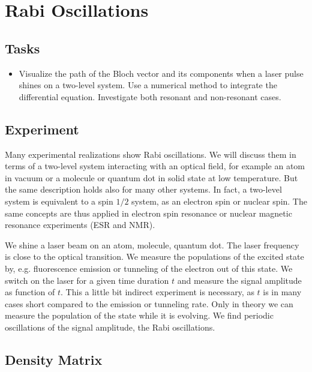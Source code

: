 

\chapter{Rabi Oscillations}



\section{Tasks}

\begin{itemize}
\item  Visualize the  path of the Bloch vector and its components when a laser pulse shines on a two-level system. Use a numerical method to integrate the differential equation. Investigate both resonant and non-resonant cases.
\end{itemize}



\section{Experiment}

Many experimental realizations show Rabi oscillations. We will discuss them in terms of a two-level system interacting with an optical field, for example an atom in vacuum or a molecule or quantum dot in solid state at low temperature. But the same description holds also for many other systems. In fact, a two-level system is equivalent to a spin $1/2$ system, as an electron spin or nuclear spin. The same concepts are thus applied in electron spin resonance or nuclear magnetic resonance experiments (ESR and NMR).

We shine a laser beam on an atom, molecule, quantum dot. The laser frequency is close to the optical transition. We measure the populations of the excited state by, e.g. fluorescence emission or tunneling of the electron out of this state. We switch on the laser for a given time duration $t$ and measure the signal amplitude as function of $t$. This a little bit indirect experiment is necessary, as $t$ is in many cases short compared to the emission or tunneling rate. Only in theory we can measure the population of the state while it is evolving. We find periodic oscillations of the signal amplitude, the Rabi oscillations.

\section{Density Matrix}


